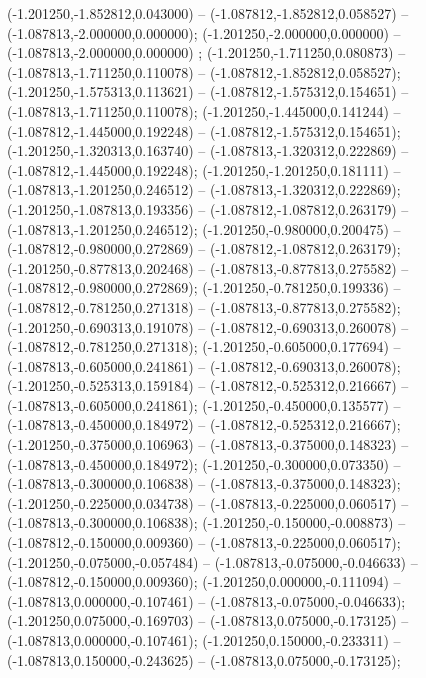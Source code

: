  (-1.201250,-1.852812,0.043000) -- (-1.087812,-1.852812,0.058527) -- (-1.087813,-2.000000,0.000000);
 (-1.201250,-2.000000,0.000000) -- (-1.087813,-2.000000,0.000000) ;
 (-1.201250,-1.711250,0.080873) -- (-1.087813,-1.711250,0.110078) -- (-1.087812,-1.852812,0.058527);
 (-1.201250,-1.575313,0.113621) -- (-1.087812,-1.575312,0.154651) -- (-1.087813,-1.711250,0.110078);
 (-1.201250,-1.445000,0.141244) -- (-1.087812,-1.445000,0.192248) -- (-1.087812,-1.575312,0.154651);
 (-1.201250,-1.320313,0.163740) -- (-1.087813,-1.320312,0.222869) -- (-1.087812,-1.445000,0.192248);
 (-1.201250,-1.201250,0.181111) -- (-1.087813,-1.201250,0.246512) -- (-1.087813,-1.320312,0.222869);
 (-1.201250,-1.087813,0.193356) -- (-1.087812,-1.087812,0.263179) -- (-1.087813,-1.201250,0.246512);
 (-1.201250,-0.980000,0.200475) -- (-1.087812,-0.980000,0.272869) -- (-1.087812,-1.087812,0.263179);
 (-1.201250,-0.877813,0.202468) -- (-1.087813,-0.877813,0.275582) -- (-1.087812,-0.980000,0.272869);
 (-1.201250,-0.781250,0.199336) -- (-1.087812,-0.781250,0.271318) -- (-1.087813,-0.877813,0.275582);
 (-1.201250,-0.690313,0.191078) -- (-1.087812,-0.690313,0.260078) -- (-1.087812,-0.781250,0.271318);
 (-1.201250,-0.605000,0.177694) -- (-1.087813,-0.605000,0.241861) -- (-1.087812,-0.690313,0.260078);
 (-1.201250,-0.525313,0.159184) -- (-1.087812,-0.525312,0.216667) -- (-1.087813,-0.605000,0.241861);
 (-1.201250,-0.450000,0.135577) -- (-1.087813,-0.450000,0.184972) -- (-1.087812,-0.525312,0.216667);
 (-1.201250,-0.375000,0.106963) -- (-1.087813,-0.375000,0.148323) -- (-1.087813,-0.450000,0.184972);
 (-1.201250,-0.300000,0.073350) -- (-1.087813,-0.300000,0.106838) -- (-1.087813,-0.375000,0.148323);
 (-1.201250,-0.225000,0.034738) -- (-1.087813,-0.225000,0.060517) -- (-1.087813,-0.300000,0.106838);
 (-1.201250,-0.150000,-0.008873) -- (-1.087812,-0.150000,0.009360) -- (-1.087813,-0.225000,0.060517);
 (-1.201250,-0.075000,-0.057484) -- (-1.087813,-0.075000,-0.046633) -- (-1.087812,-0.150000,0.009360);
 (-1.201250,0.000000,-0.111094) -- (-1.087813,0.000000,-0.107461) -- (-1.087813,-0.075000,-0.046633);
 (-1.201250,0.075000,-0.169703) -- (-1.087813,0.075000,-0.173125) -- (-1.087813,0.000000,-0.107461);
 (-1.201250,0.150000,-0.233311) -- (-1.087813,0.150000,-0.243625) -- (-1.087813,0.075000,-0.173125);
